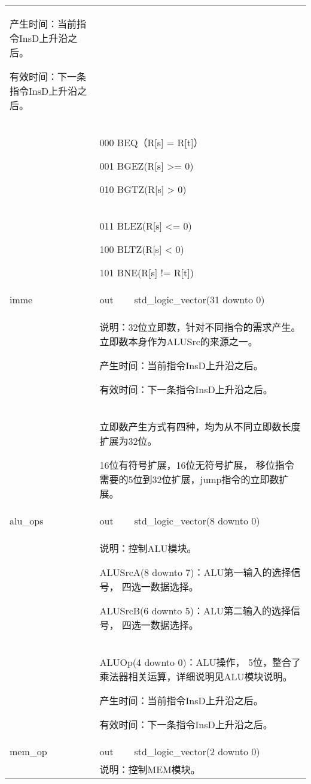 \begin{tabularx}{\textwidth}{lll}
{                产生时间：当前指令InsD上升沿之后。

                有效时间：下一条指令InsD上升沿之后。 
            } \\
            &
            \multicolumn{2}{X}{
                000 BEQ（R[s] = R[t]）

                001 BGEZ(R[s] >= 0)

                010 BGTZ(R[s] > 0)
            } \\
            &
            \multicolumn{2}{X}{
                011 BLEZ(R[s] <= 0)

                100 BLTZ(R[s] < 0)

                101 BNE(R[s] != R[t])
            } \\
            \midrule
            imme            & out       & std\_logic\_vector(31 downto 0) \\
            \cmidrule(l){2-3}
            &
            \multicolumn{2}{X}{
                说明：32位立即数，针对不同指令的需求产生。%
                立即数本身作为ALUSrc的来源之一。

                产生时间：当前指令InsD上升沿之后。

                有效时间：下一条指令InsD上升沿之后。 
            } \\
            &
            \multicolumn{2}{X}{
                立即数产生方式有四种，均为从不同立即数长度扩展为32位。

                16位有符号扩展，16位无符号扩展，%
                移位指令需要的5位到32位扩展，jump指令的立即数扩展。
            } \\
            \midrule
            alu\_ops        & out       & std\_logic\_vector(8 downto 0) \\
            \cmidrule(l){2-3}
            &
            \multicolumn{2}{X}{
                说明：控制ALU模块。

                ALUSrcA(8 downto 7)：ALU第一输入的选择信号，%
                四选一数据选择。

                ALUSrcB(6 downto 5)：ALU第二输入的选择信号，%
                四选一数据选择。
            } \\
            &
            \multicolumn{2}{X}{
                ALUOp(4 downto 0)：ALU操作，%
                5位，整合了乘法器相关运算，详细说明见ALU模块说明。

                产生时间：当前指令InsD上升沿之后。

                有效时间：下一条指令InsD上升沿之后。 
            } \\
            \midrule
            mem\_op         & out       & std\_logic\_vector(2 downto 0) \\
            \cmidrule(l){2-3}
            &
            \multicolumn{2}{X}{
                说明：控制MEM模块。

}
\end{tabularx}
